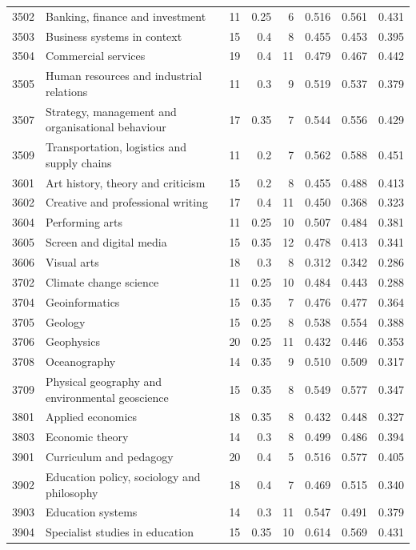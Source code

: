 \begin{longtable}{r p{3.35cm} rr r rrr}
3502 & Banking, finance and investment & 11 & 0.25 & 6 & 0.516 & 0.561 & 0.431 \\
3503 & Business systems in context & 15 & 0.4 & 8 & 0.455 & 0.453 & 0.395 \\
3504 & Commercial services & 19 & 0.4 & 11 & 0.479 & 0.467 & 0.442 \\
3505 & Human resources and industrial relations & 11 & 0.3 & 9 & 0.519 & 0.537 & 0.379 \\
3507 & Strategy, management and organisational behaviour & 17 & 0.35 & 7 & 0.544 & 0.556 & 0.429 \\
3509 & Transportation, logistics and supply chains & 11 & 0.2 & 7 & 0.562 & 0.588 & 0.451 \\
3601 & Art history, theory and criticism & 15 & 0.2 & 8 & 0.455 & 0.488 & 0.413 \\
3602 & Creative and professional writing & 17 & 0.4 & 11 & 0.450 & 0.368 & 0.323 \\
3604 & Performing arts & 11 & 0.25 & 10 & 0.507 & 0.484 & 0.381 \\
3605 & Screen and digital media & 15 & 0.35 & 12 & 0.478 & 0.413 & 0.341 \\
3606 & Visual arts & 18 & 0.3 & 8 & 0.312 & 0.342 & 0.286 \\
3702 & Climate change science & 11 & 0.25 & 10 & 0.484 & 0.443 & 0.288 \\
3704 & Geoinformatics & 15 & 0.35 & 7 & 0.476 & 0.477 & 0.364 \\
3705 & Geology & 15 & 0.25 & 8 & 0.538 & 0.554 & 0.388 \\
3706 & Geophysics & 20 & 0.25 & 11 & 0.432 & 0.446 & 0.353 \\
3708 & Oceanography & 14 & 0.35 & 9 & 0.510 & 0.509 & 0.317 \\
3709 & Physical geography and environmental geoscience & 15 & 0.35 & 8 & 0.549 & 0.577 & 0.347 \\
3801 & Applied economics & 18 & 0.35 & 8 & 0.432 & 0.448 & 0.327 \\
3803 & Economic theory & 14 & 0.3 & 8 & 0.499 & 0.486 & 0.394 \\
3901 & Curriculum and pedagogy & 20 & 0.4 & 5 & 0.516 & 0.577 & 0.405 \\
3902 & Education policy, sociology and philosophy & 18 & 0.4 & 7 & 0.469 & 0.515 & 0.340 \\
3903 & Education systems & 14 & 0.3 & 11 & 0.547 & 0.491 & 0.379 \\
3904 & Specialist studies in education & 15 & 0.35 & 10 & 0.614 & 0.569 & 0.431 \\

\end{longtable}
